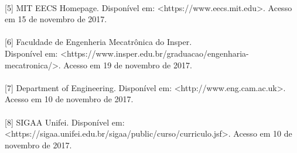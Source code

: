 \documentclass[12pt]{article} %
\begin{document}
\paragraph{}

[5] MIT EECS Homepage. Disponível em: <https://www.eecs.mit.edu>. Acesso em 15 de novembro de 2017.

\paragraph{}

[6] Faculdade de Engenheria Mecatrônica do Insper. \\
Disponível em: <https://www.insper.edu.br/graduacao/engenharia-mecatronica/>. Acesso em 19 de novembro de 2017.

\paragraph{}

[7] Department of Engineering. Disponível em: <http://www.eng.cam.ac.uk>. Acesso em 10 de novembro de 2017.

\paragraph{}

[8] SIGAA Unifei. Disponível em: \\
<https://sigaa.unifei.edu.br/sigaa/public/curso/curriculo.jsf>. Acesso em 10 de novembro de 2017.
\end{document}
